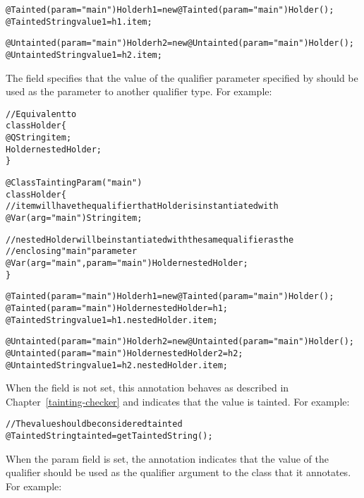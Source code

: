 \begin{description}
\begin{alltt}
  @Tainted(param="main") Holder h1 = new @Tainted(param="main") Holder();
  @Tainted String value1 = h1.item;

  @Untainted(param="main") Holder h2 = new @Untainted(param="main") Holder();
  @Untainted String value1 = h2.item;

\end{alltt}

The  field specifies that the value of the
qualifier parameter specified by  should be used as the parameter
to another qualifier type. For example:

\begin{alltt}

  // Equivalent to
  class Holder  \{
    @Q String item;
    Holder nestedHolder;
  \}

  @ClassTaintingParam ("main")
  class Holder \{
    // item will have the qualifier that Holder is instantiated with
    @Var(arg="main") String item;

    // nestedHolder will be instantiated with the same qualifier as the
    // enclosing "main" parameter
    @Var(arg="main", param="main") Holder nestedHolder;
  \}

  @Tainted(param="main") Holder h1 = new @Tainted(param="main") Holder();
  @Tainted(param="main") Holder nestedHolder = h1;
  @Tainted String value1 = h1.nestedHolder.item;

  @Untainted(param="main") Holder h2 = new @Untainted(param="main") Holder();
  @Untainted(param="main") Holder nestedHolder2 = h2;
  @Untainted String value1 = h2.nestedHolder.item;

\end{alltt}

\item[\refqualclass{checker/experimental/tainting_qual_poly/qual}{Tainted}]
When the  field is not set, this annotation behaves as described in
Chapter~\ref{tainting-checker} and indicates that the value is tainted.
For example:

\begin{alltt}
  // The value should be considered tainted
  @Tainted String tainted  = getTaintedString();
\end{alltt}

When the  param field is set, the annotation indicates that the
value of the  qualifier should be used as the qualifier
argument to the class that it annotates. For example:

\begin{alltt}


\end{alltt}
\end{description}
